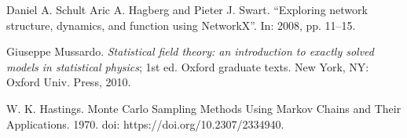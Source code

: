 \documentclass[11pt,a4paper]{article}
\numberwithin{thm}{section}
\numberwithin{prop}{section}
\numberwithin{obs}{section}
\numberwithin{equation}{section}
\numberwithin{defin}{section}
\begin{document}


\tableofcontents









\begin{thebibliography}{9}
    Daniel A. Schult Aric A. Hagberg and Pieter J. Swart. “Exploring network structure,
    dynamics, and function using NetworkX”. In: 2008, pp. 11–15.

    Giuseppe Mussardo. \emph{Statistical field theory: an introduction to exactly solved models in
    statistical physics}; 1st ed. Oxford graduate texts. New York, NY: Oxford Univ. Press, 2010.

    W. K. Hastings. Monte Carlo Sampling Methods Using Markov Chains and Their Applications. 1970. doi: https://doi.org/10.2307/2334940.
    \end{thebibliography}
\end{document}

